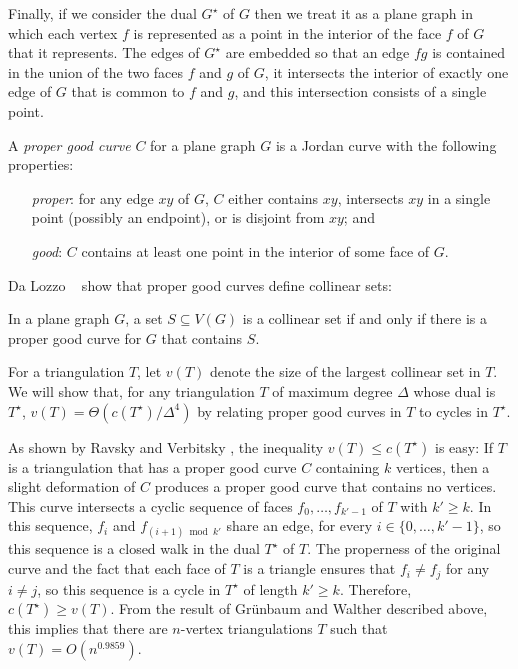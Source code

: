 \documentclass{patmorin}
\newcommand{\dual}[1]{{#1}^\star}
\begin{document}
Finally, if we consider the dual $\dual{G}$ of $G$ then we treat it
as a plane graph in which each vertex $f$ is represented as a point in
the interior of the face $f$ of $G$ that it represents.  The edges of
$\dual{G}$ are embedded so that an edge $fg$ is contained in the union of
the two faces $f$ and $g$ of $G$, it intersects the interior of exactly
one edge of $G$ that is common to $f$ and $g$, and this intersection
consists of a single point.

A \emph{proper good curve} $C$ for a plane graph $G$ is a
Jordan curve with the following properties:
\begin{enumerate}
	\item[\emph{proper}:] for any edge $xy$ of $G$, $C$ either contains $xy$, intersects
  $xy$ in a single point (possibly an endpoint), or is disjoint
  from $xy$; and
  \item[\emph{good}:] $C$ contains at least one point in the interior of
  some face of $G$.
\end{enumerate}

Da Lozzo \etal\ \cite{dalozzo.dujmovic.ea:drawing} show that proper good
curves define collinear sets:

\begin{thm}
  In a plane graph $G$, a set $S\subseteq V(G)$ is a collinear set if
  and only if there is a proper good curve for $G$ that contains $S$.
\end{thm}

For a triangulation $T$, let $v(T)$ denote the size of the largest
collinear set in $T$.  We will show that, for any triangulation $T$
of maximum degree $\Delta$
whose dual is $\dual{T}$, $v(T)=\Theta(c(\dual{T})/\Delta^4)$ by relating proper good curves in $T$ to cycles in $\dual{T}$.

As shown by Ravsky and Verbitsky
\cite{ravsky.verbitsky:on,ravsky.verbitsky:on-arxiv}, the inequality $v(T)
\le c(\dual{T})$ is easy: If $T$ is a triangulation that has a proper
good curve $C$ containing $k$ vertices, then a slight deformation of
$C$ produces a proper good curve that contains no vertices. This curve
intersects a cyclic sequence of faces $f_0,\ldots,f_{k'-1}$ of $T$
with $k'\ge k$.  In this sequence, $f_i$ and $f_{(i+1)\bmod k'}$ share
an edge, for every $i\in\{0,\ldots,k'-1\}$, so this sequence is a closed
walk in the dual $\dual{T}$ of $T$.  The properness of the original curve
and the fact that each face of $T$ is a triangle ensures that $f_i\neq
f_j$ for any $i\neq j$, so this sequence is a cycle in $\dual{T}$ of
length $k'\ge k$.  Therefore, $c(\dual{T})\ge v(T)$. From the result
of Gr\"unbaum and Walther described above, this implies that there are
$n$-vertex triangulations $T$ such that $v(T) = O(n^{0.9859})$.
\end{document}
